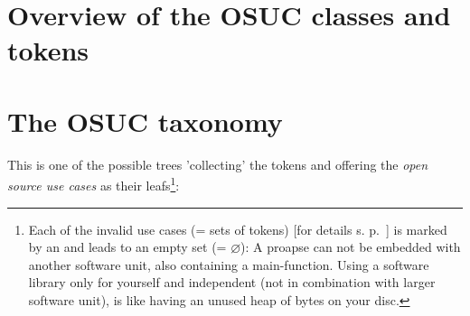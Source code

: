 \section{Overview of the OSUC classes and tokens}


\begin{footnotesize}
\begin{minipage}{\textwidth}
\end{minipage}
\end{footnotesize}  
  
\section{The OSUC taxonomy}

This is one of the possible trees 'collecting' the tokens and offering the
\emph{open source use cases} as their leafs\footnote{ Each of the invalid use
cases (= sets of tokens) [for details s. p.\
\pageref{InvalidFinderTokenCombinations}] is marked by an \lightning{} and leads
to an empty set (= $\varnothing$): A proapse can not be embedded with another
software unit, also containing a main-function. Using a software library only
for yourself and independent (not in combination with larger software unit), is
like having an unused heap of bytes on your disc.}:

